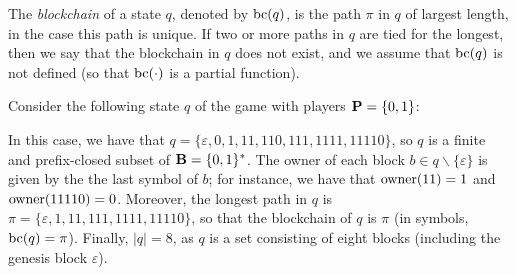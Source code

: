 The {\em blockchain} of a state $q$, denoted by $\text{bc}(q)$, is the path $\pi$ in $q$ of largest length, in the case this path is unique.
If two or more paths in $q$ are tied for the longest, then we say that the blockchain in $q$ does not exist, and we assume that $\text{bc}(q)$ is not defined (so that $\text{bc}(\cdot)$ is a partial function). %
%
\begin{example}\label{ex-mining}
Consider the following state $q$ of the game with players $\mathbf{P} =\{0,1\}$:
\vspace*{-9pt}
\begin{center}
\end{center}
\vspace*{-9pt}
In this case, we have that $q = \{\varepsilon, 0, 1, 11, 110, 111, 1111, 11110\}$, so $q$ is a finite and prefix-closed subset of $\mathbf{B} = \{0,1\}^*$. The owner of each block $b \in q \smallsetminus \{ \varepsilon\}$ is given by the the last symbol of $b$; for instance, we have that $\text{\rm owner}(11) = 1$ and $\text{\rm owner}(11110) = 0$. Moreover, the longest path in $q$ is $\pi = \{\varepsilon, 1, 11, 111, 1111, 11110\}$, so that the blockchain of $q$ is $\pi$ (in symbols, $\text{bc}(q) = \pi$).
Finally, 
$|q| = 8$, as $q$ is a set consisting of eight blocks (including the genesis block $\varepsilon$). 


\end{example}
